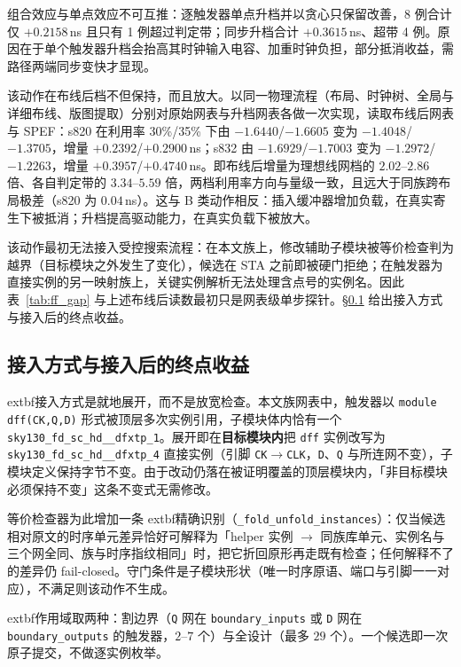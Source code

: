 \documentclass[twocolumn,10pt,fontset=windows]{ctexart}
\begin{document}
组合效应与单点效应不可互推：逐触发器单点升档并以贪心只保留改善，8 例合计仅 $+0.2158$\,ns 且只有 1 例超过判定带；同步升档合计 $+0.3615$\,ns、超带 4 例。原因在于单个触发器升档会抬高其时钟输入电容、加重时钟负担，部分抵消收益，需路径两端同步变快才显现。

该动作在布线后档不但保持，而且放大。以同一物理流程（布局、时钟树、全局与详细布线、版图提取）分别对原始网表与升档网表各做一次实现，读取布线后网表与 SPEF：s820 在利用率 30\%/35\% 下由 $-1.6440$/$-1.6605$ 变为 $-1.4048$/$-1.3705$，增量 $+0.2392$/$+0.2900$\,ns；s832 由 $-1.6929$/$-1.7003$ 变为 $-1.2972$/$-1.2263$，增量 $+0.3957$/$+0.4740$\,ns。即布线后增量为理想线网档的 $2.02$--$2.86$ 倍、各自判定带的 $3.34$--$5.59$ 倍，两档利用率方向与量级一致，且远大于同族跨布局极差（s820 为 $0.04$\,ns）。这与 B 类动作相反：插入缓冲器增加负载，在真实寄生下被抵消；升档提高驱动能力，在真实负载下被放大。

该动作最初无法接入受控搜索流程：在本文族上，修改辅助子模块被等价检查判为越界（目标模块之外发生了变化），候选在 STA 之前即被硬门拒绝；在触发器为直接实例的另一映射族上，关键实例解析无法处理含点号的实例名。因此表~\ref{tab:ff_gap} 与上述布线后读数最初只是网表级单步探针。\S\ref{sec:ff_integrated} 给出接入方式与接入后的终点收益。

\subsection{接入方式与接入后的终点收益}\label{sec:ff_integrated}

	extbf{接入方式}是就地展开，而不是放宽检查。本文族网表中，触发器以 \texttt{module dff(CK,Q,D)} 形式被顶层多次实例引用，子模块体内恰有一个 \texttt{sky130\_fd\_sc\_hd\_\_dfxtp\_1}。展开即在\textbf{目标模块内}把 \texttt{dff} 实例改写为 \texttt{sky130\_fd\_sc\_hd\_\_dfxtp\_4} 直接实例（引脚 \texttt{CK}$\to$\texttt{CLK}，\texttt{D}、\texttt{Q} 与所连网不变），子模块定义保持字节不变。由于改动仍落在被证明覆盖的顶层模块内，「非目标模块必须保持不变」这条不变式无需修改。

等价检查器为此增加一条	extbf{精确识别}（\texttt{\_fold\_unfold\_instances}）：仅当候选相对原文的时序单元差异恰好可解释为「helper 实例 $\to$ 同族库单元、实例名与三个网全同、族与时序指纹相同」时，把它折回原形再走既有检查；任何解释不了的差异仍 fail-closed。守门条件是子模块形状（唯一时序原语、端口与引脚一一对应），不满足则该动作不生成。

	extbf{作用域}取两种：割边界（\texttt{Q} 网在 \texttt{boundary\_inputs} 或 \texttt{D} 网在 \texttt{boundary\_outputs} 的触发器，$2$--$7$ 个）与全设计（最多 $29$ 个）。一个候选即一次原子提交，不做逐实例枚举。
\end{document}
